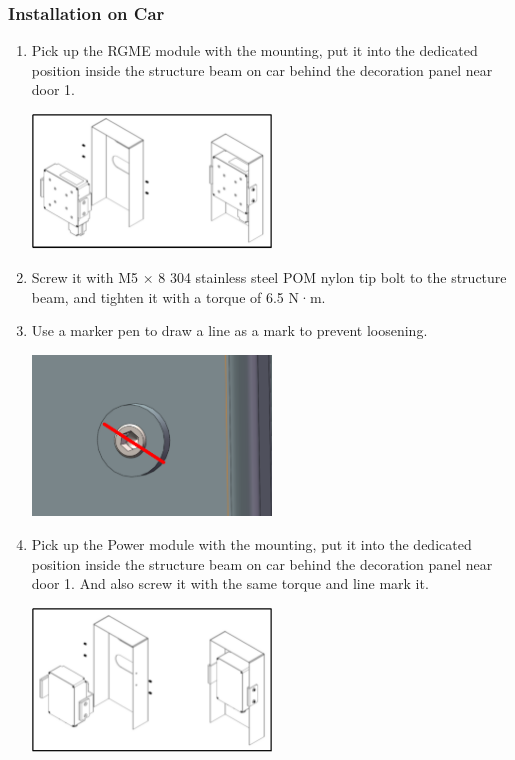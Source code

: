 \documentclass{article}
\begin{document}
\subsubsection{Installation on Car}
\begin{enumerate}
    \item Pick up the RGME module with the mounting, put it into the dedicated position inside the structure beam on car behind the decoration panel near door 1.\\
    \begin{center}
        \includegraphics[width=0.5\textwidth]{RGME ready.png}
    \end{center}
    \item Screw it with M5 × 8 304 stainless steel POM nylon tip bolt to the structure beam, and tighten it with a torque of 6.5 N·m.\\
    \item Use a marker pen to draw a line as a mark to prevent loosening.\\
    \begin{center}
        \includegraphics[width=0.5\textwidth]{Mark2.png}
    \end{center}
    \item Pick up the Power module with the mounting, put it into the dedicated position inside the structure beam on car behind the decoration panel near door 1. And also screw it with the same torque and line mark it.\\
    \begin{center}
        \includegraphics[width=0.5\textwidth]{Battery ready.png}

\end{center}
\end{enumerate}
\end{document}
